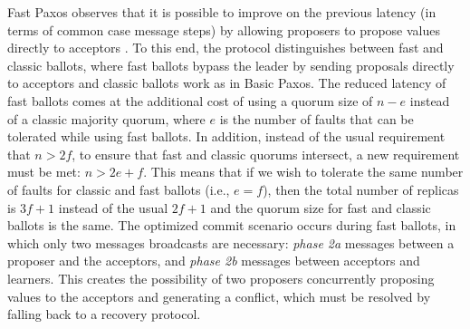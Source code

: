 Fast Paxos observes that it is possible to improve on the previous latency (in terms of common case message steps) by allowing proposers to propose values directly to acceptors \cite{L06}. To this end, the protocol distinguishes between fast and classic ballots, where fast ballots bypass the leader by sending proposals directly to acceptors and classic ballots work as in Basic Paxos. The reduced latency of fast ballots comes at the additional cost of using a quorum size of $n-e$ instead of a classic majority quorum, where $e$ is the number of faults that can be tolerated while using fast ballots. In addition, instead of the usual requirement that $n> 2f$, to ensure that fast and classic quorums intersect, a new requirement must be met: $n > 2e+f$.  This means that if we wish to tolerate the same number of faults for classic and fast ballots (i.e., $e=f$), then the total number of replicas is $3f+1$ instead of the usual $2f+1$ and the quorum size for fast and classic ballots is the same. The optimized commit scenario occurs during fast ballots, in which only two messages broadcasts are necessary: \textit{phase 2a} messages between a proposer and the acceptors, and \textit{phase 2b} messages between acceptors and learners. This creates the possibility of two proposers concurrently proposing values to the acceptors and generating a conflict, which must be resolved by falling back to a recovery protocol. \par

